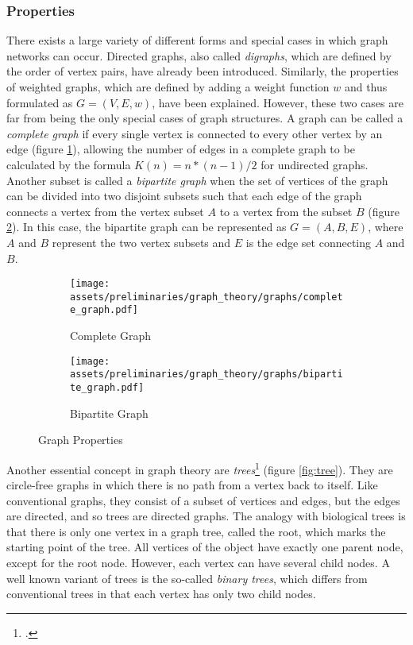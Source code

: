 \documentclass[a4paper, 12pt]{report}
\begin{document}
\subsubsection{Properties}\label{subsec:properties}

There exists a large variety of different forms and special cases in which graph networks can occur. Directed graphs, also called \textit{digraphs}, which are defined by the order of vertex pairs, have already been introduced. Similarly, the properties of weighted graphs, which are defined by adding a weight function $w$ and thus formulated as $G = (V, E, w)$, have been explained. However, these two cases are far from being the only special cases of graph structures. A graph can be called a \textit{complete graph} if every single vertex is connected to every other vertex by an edge (figure \ref{fig:complete-graph}), allowing the number of edges in a complete graph to be calculated by the formula \(K(n) = n * (n - 1) / 2\) for undirected graphs. Another subset is called a \textit{bipartite graph} when the set of vertices of the graph can be divided into two disjoint subsets such that each edge of the graph connects a vertex from the vertex subset $A$ to a vertex from the subset $B$ (figure \ref{fig:bipartite-graph}). In this case, the bipartite graph can be represented as $G = (A, B, E)$, where $A$ and $B$ represent the two vertex subsets and $E$ is the edge set connecting $A$ and $B$.

\begin{figure}
\centering
\begin{subfigure}{.5\textwidth}
\centering
\texttt{[image: assets/preliminaries/graph\_theory/graphs/complete\_graph.pdf]}
\caption{Complete Graph}
\label{fig:complete-graph}
\end{subfigure}%
\begin{subfigure}{.5\textwidth}
\centering
\texttt{[image: assets/preliminaries/graph\_theory/graphs/bipartite\_graph.pdf]}
\caption{Bipartite Graph}
\label{fig:bipartite-graph}
\end{subfigure}
\caption{Graph Properties}
\label{fig:graph-properties-1}
\end{figure}

Another essential concept in graph theory are \textit{trees}\footcite{wilson1979introduction} (figure \ref{fig:tree}). They are circle-free graphs in which there is no path from a vertex back to itself. Like conventional graphs, they consist of a subset of vertices and edges, but the edges are directed, and so trees are directed graphs. The analogy with biological trees is that there is only one vertex in a graph tree, called the root, which marks the starting point of the tree. All vertices of the object have exactly one parent node, except for the root node. However, each vertex can have several child nodes. A well known variant of trees is the so-called \textit{\glspl{binary tree}}, which differs from conventional trees in that each vertex has only two child nodes.
\end{document}
